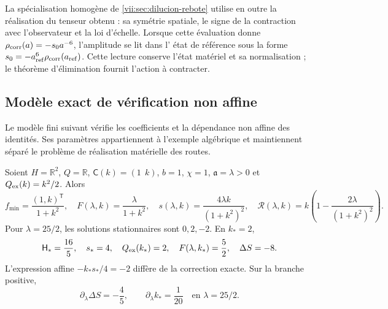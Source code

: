 La spécialisation homogène de
\ref{vii:sec:dilucion-rebote} utilise en outre la réalisation du
tenseur obtenu : sa symétrie spatiale, le signe de la contraction
avec l'observateur et la loi d'échelle. Lorsque cette évaluation donne
\(\rho_{\rm corr}(a)=-s_0a^{-6}\), l'amplitude se lit dans l'
état de référence sous la forme
\(s_0=-a_{\rm ref}^{6}\rho_{\rm corr}(a_{\rm ref})\).
Cette lecture conserve l'état matériel et sa normalisation ; le
théorème d'élimination fournit l'action à contracter.

\subsection{Modèle exact de vérification non affine}
\label{vii:subsec:control-no-afin}

Le modèle fini suivant vérifie les coefficients et la dépendance non affine des identités. Ses paramètres appartiennent à l'exemple algébrique et maintiennent séparé le problème de réalisation matérielle des routes.

\begin{proposition}
\label{vii:prop:ejemplo-no-afin}
Soient \(H=\mathbb R^2\), \(Q=\mathbb R\), \(\mathsf C(k)=(1\ \ k)\), \(b=1\), \(\chi=1\), \(\mathfrak a=\lambda>0\) et \(Q_{\rm ex}(k)=k^2/2\). Alors
\begin{equation}
 f_{\min}=\frac{(1,k)^{\mathsf T}}{1+k^2},\quad
 F(\lambda,k)=\frac{\lambda}{1+k^2},\quad
 s(\lambda,k)=\frac{4\lambda k}{(1+k^2)^2},\quad
 \mathcal R(\lambda,k)
    =k\left(1-\frac{2\lambda}{(1+k^2)^2}\right).
 \label{vii:eq:ejemplo-minimo-no-afin}
\end{equation}
Pour \(\lambda=25/2\), les solutions stationnaires sont
\(0,2,-2\). En \(k_*=2\),
\begin{equation}
 \mathsf H_*=\frac{16}{5},\quad s_*=4,\quad
 Q_{\rm ex}(k_*)=2,\quad F(\lambda,k_*)=\frac52,
 \quad \Delta S=-8.
 \label{vii:eq:valores-ejemplo-no-afin}
\end{equation}
L'expression affine \(-k_*s_*/4=-2\) diffère de la correction
exacte. Sur la branche positive,
\begin{equation}
 \partial_\lambda\Delta S=-\frac45,
 \qquad \partial_\lambda k_* =\frac1{20}
 \quad\text{en }\lambda=25/2.
 \label{vii:eq:derivadas-ejemplo-no-afin}
\end{equation}
\end{proposition}

